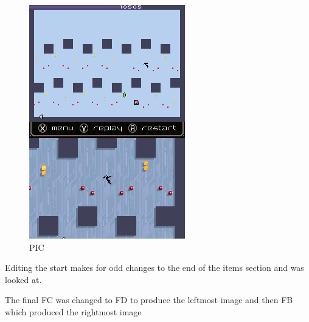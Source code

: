 \documentclass[
]{book}
\begin{document}
\begin{figure}
\centering
\includegraphics{images/182_home_fast6191_romhackingguide_unrenamed_fil___rs_romhackingguideleveleditingworkedNplus15.png}
\caption{PIC}
\end{figure}

Editing the start makes for odd changes to the end of the items section and was looked at.

The final FC was changed to FD to produce the leftmost image and then FB which produced the rightmost image
\end{document}
